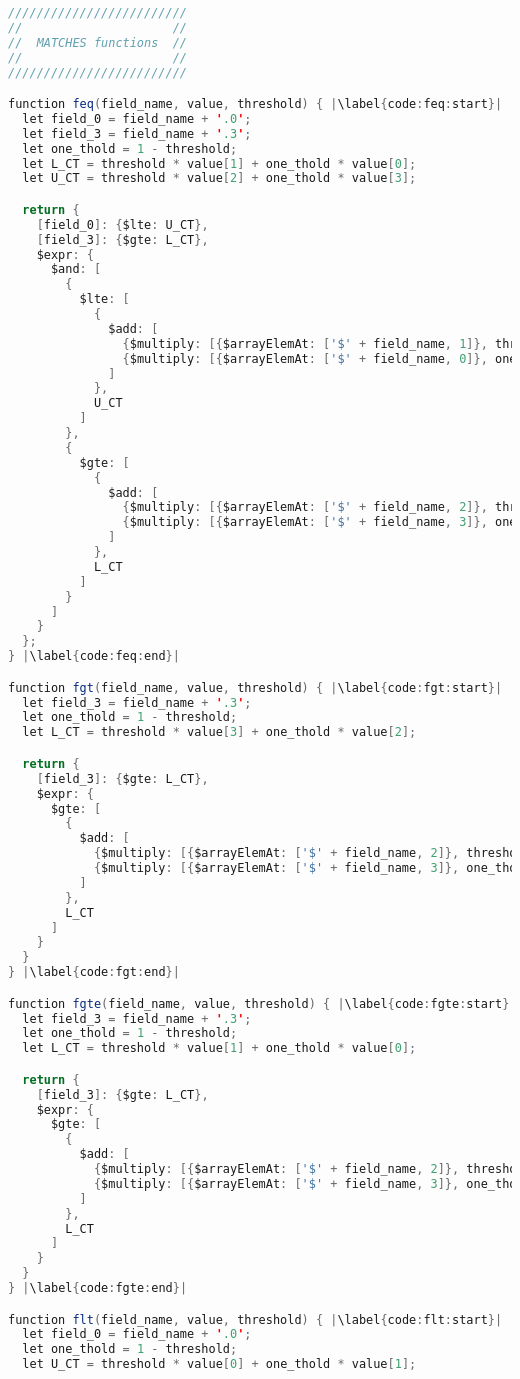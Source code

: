 \label{appendix:code}
\begin{lstlisting}[language=java, escapechar=|]
/////////////////////////
//                     //
//  MATCHES functions  //
//                     //
/////////////////////////

function feq(field_name, value, threshold) { |\label{code:feq:start}|
  let field_0 = field_name + '.0';
  let field_3 = field_name + '.3';
  let one_thold = 1 - threshold;
  let L_CT = threshold * value[1] + one_thold * value[0];
  let U_CT = threshold * value[2] + one_thold * value[3];

  return {
    [field_0]: {$lte: U_CT},
    [field_3]: {$gte: L_CT},
    $expr: {
      $and: [
        {
          $lte: [
            {
              $add: [
                {$multiply: [{$arrayElemAt: ['$' + field_name, 1]}, threshold]},
                {$multiply: [{$arrayElemAt: ['$' + field_name, 0]}, one_thold]}
              ]
            },
            U_CT
          ]
        },
        {
          $gte: [
            {
              $add: [
                {$multiply: [{$arrayElemAt: ['$' + field_name, 2]}, threshold]},
                {$multiply: [{$arrayElemAt: ['$' + field_name, 3]}, one_thold]}
              ]
            },
            L_CT
          ]
        }
      ]
    }
  };
} |\label{code:feq:end}|

function fgt(field_name, value, threshold) { |\label{code:fgt:start}|
  let field_3 = field_name + '.3';
  let one_thold = 1 - threshold;
  let L_CT = threshold * value[3] + one_thold * value[2];

  return {
    [field_3]: {$gte: L_CT},
    $expr: {
      $gte: [
        {
          $add: [
            {$multiply: [{$arrayElemAt: ['$' + field_name, 2]}, threshold]},
            {$multiply: [{$arrayElemAt: ['$' + field_name, 3]}, one_thold]}
          ]
        },
        L_CT
      ]
    }
  }
} |\label{code:fgt:end}|

function fgte(field_name, value, threshold) { |\label{code:fgte:start}|
  let field_3 = field_name + '.3';
  let one_thold = 1 - threshold;
  let L_CT = threshold * value[1] + one_thold * value[0];

  return {
    [field_3]: {$gte: L_CT},
    $expr: {
      $gte: [
        {
          $add: [
            {$multiply: [{$arrayElemAt: ['$' + field_name, 2]}, threshold]},
            {$multiply: [{$arrayElemAt: ['$' + field_name, 3]}, one_thold]}
          ]
        },
        L_CT
      ]
    }
  }
} |\label{code:fgte:end}|

function flt(field_name, value, threshold) { |\label{code:flt:start}|
  let field_0 = field_name + '.0';
  let one_thold = 1 - threshold;
  let U_CT = threshold * value[0] + one_thold * value[1];


\end{lstlisting}
